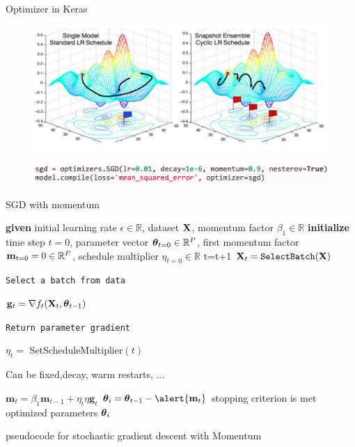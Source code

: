 \documentclass[xcolor=pdftex,dvipsnames,table,mathserif]{beamer}
\begin{document}
\begin{frame}{Optimizer in Keras}
\begin{figure}
\includegraphics[width=.95\columnwidth]{../graphics/SnapshotCurve}
\caption{\cite{huang2017snapshot}}
\end{figure}
\begin{figure}
\includegraphics[width=.95\columnwidth]{../graphics/KerasSGD}
\end{figure}
\end{frame}


\begin{frame}{SGD with momentum \cite{Qian99}}
\begin{algorithm}[H]
\begin{algorithmic}[1]
\STATE \textbf{given} initial learning rate $\epsilon \in \mathbb{R}$, dataset $\mathbf{X}$, \alert{momentum factor $\beta_1 \in \mathbb{R}$}
\STATE \textbf{initialize} time step $t=0$, parameter vector $\boldsymbol{\theta}_{t=0} \in \mathbb{R}^P$, first momentum factor $\mathbf{m}_{t=0}=0 \in \mathbb{R}^P$, schedule multiplier $\eta_{t=0} \in \mathbb{R}$
\REPEAT
\STATE t=t+1
\STATE $\mathbf{X}_t=\texttt{SelectBatch} (\mathbf{X})$ \begin{tiny}\texttt{Select a batch from data} \end{tiny}
\STATE $\mathbf{g}_t = \nabla f_t(\mathbf{X}_t,\boldsymbol{\theta}_{t-1})$ \begin{tiny}\texttt{Return parameter gradient} \end{tiny}
\STATE $\eta_t = $ SetScheduleMultiplier$(t)$ \begin{tiny}{Can be fixed,decay, warm restarts, ...}\end{tiny}
\STATE \alert{$\mathbf{m}_t = \beta_1 \mathbf{m}_{t-1} + \eta_{t} \eta  \mathbf{g}_t $}
\STATE $\param_i=\param_{t-1} - \alert{\mathbf{m}_{t}}$
\UNTIL stopping criterion is met
\RETURN optimized parameters $\boldsymbol{\theta}_i$
\end{algorithmic}
\caption{pseudocode for stochastic gradient descent \alert{with Momentum} }
\label{alg:seq}
\end{algorithm}
\end{frame}
\end{document}
